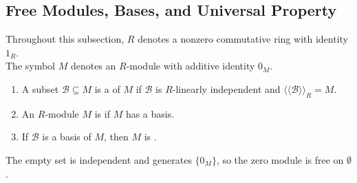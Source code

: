 \subsection{Free Modules, Bases, and Universal Property}

Throughout this subsection, $R$ denotes a nonzero commutative ring with identity $1_R$.\\
The symbol $M$ denotes an $R$-module with additive identity $0_M$.

\begin{definition} \label{def:free-module-basis} 
\begin{enumerate}[label=(\roman*)]
\setlength{\itemsep}{0pt}
\item A subset $\mathcal{B}\subseteq M$ is a  of $M$ if $\mathcal{B}$ is $R$-linearly independent and $\langle\!\langle\mathcal{B}\rangle\!\rangle_R=M$.
\item An $R$-module $M$ is  if $M$ has a basis.
\item If $\mathcal{B}$ is a basis of $M$, then $M$ is .
\end{enumerate}
The empty set is independent and generates $\{0_M\}$, so the zero module is free on $\emptyset$.
\end{definition}

